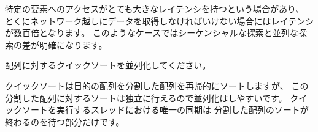 特定の要素へのアクセスがとても大きなレイテンシを持つという場合があり、
とくにネットワーク越しにデータを取得しなければいけない場合にはレイテンシが数百倍となります。
このようなケースではシーケンシャルな探索と並列な探索の差が明確になります。
\medskip
\begin{exercise}
\label{ex/qsort}
配列に対するクイックソートを並列化してください。
\end{exercise}
\begin{answer}
クイックソートは目的の配列を分割した配列を再帰的にソートしますが、
この分割した配列に対するソートは独立に行えるので並列化はしやすいです。
クイックソートを実行するスレッドにおける唯一の同期は
分割した配列のソートが終わるのを待つ部分だけです。


\end{answer}
